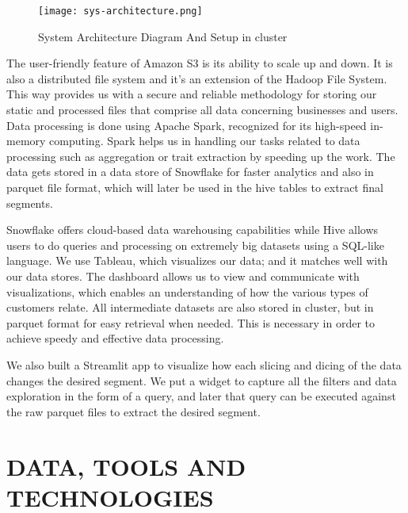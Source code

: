 \documentclass[conference]{IEEEtran}
\begin{document}
\begin{figure*}[h]
  \centering
  \texttt{[image: sys-architecture.png]}
  \caption{System Architecture Diagram And Setup in cluster}
\end{figure*}

The user-friendly feature of Amazon S3 is its ability to scale up and down. It is also a distributed file system and it's an extension of the Hadoop File System. This way provides us with a secure and reliable methodology for storing our static and processed files that comprise all data concerning businesses and users. Data processing is done using Apache Spark, recognized for its high-speed in-memory computing. Spark helps us in handling our tasks related to data processing such as aggregation or trait extraction by speeding up the work. The data gets stored in a data store of Snowflake for faster analytics and also in parquet file format, which will later be used in the hive tables to extract final segments. 

Snowflake offers cloud-based data warehousing capabilities while Hive allows users to do queries and processing on extremely big datasets using a SQL-like language. We use Tableau, which visualizes our data; and it matches well with our data stores. The dashboard allows us to view and communicate with visualizations, which enables an understanding of how the various types of customers relate. All intermediate datasets are also stored in cluster, but in parquet format for easy retrieval when needed. This is necessary in order to achieve speedy and effective data processing.

We also built a Streamlit app to visualize how each slicing and dicing of the data changes the desired segment. We put a widget to capture all the filters and data exploration in the form of a query, and later that query can be executed against the raw parquet files to extract the desired segment.


\section{DATA, TOOLS AND TECHNOLOGIES}
\end{document}
